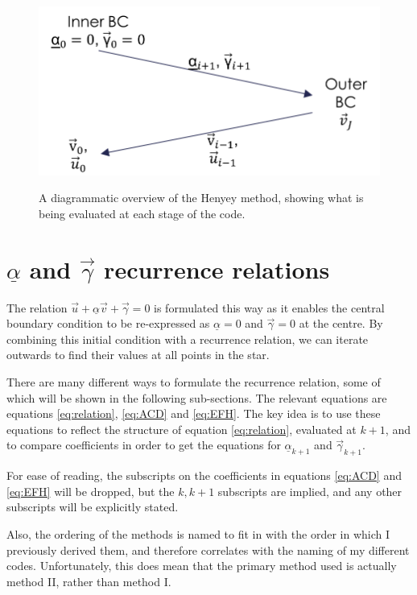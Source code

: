 \documentclass[11pt]{amsart}
\begin{document}
\begin{figure}
\begin{center}
\label{fig:overview}
\includegraphics[width = 0.5 \textwidth]{Overview.png}
\caption{A diagrammatic overview of the Henyey method, showing what is being evaluated at each stage of the code.}
\end{center}
\end{figure}



\section{$\underline{\alpha}$ and $\vec{\gamma}$ recurrence relations}

The relation $\vec{u} + \underline{\alpha} \vec{v} + \vec{\gamma} = 0$ is formulated this way as it enables the central boundary condition to be re-expressed as $\underline{\alpha} = 0$ and $\vec{\gamma} = 0$ at the centre.  By combining this initial condition with a recurrence relation, we can iterate outwards to find their values at all points in the star.

There are many different ways to formulate the recurrence relation, some of which will be shown in the following sub-sections.  The relevant equations are equations \ref{eq:relation}, \ref{eq:ACD} and \ref{eq:EFH}.  The key idea is to use these equations to reflect the structure of equation \ref{eq:relation}, evaluated at $k+1$, and to compare coefficients in order to get the equations for $\underline{\alpha}_{k+1}$ and $\vec{\gamma}_{k+1}$.

For ease of reading, the subscripts on the coefficients in equations \ref{eq:ACD} and \ref{eq:EFH} will be dropped, but the $k,k+1$ subscripts are implied, and any other subscripts will be explicitly stated.

Also, the ordering of the methods is named to fit in with the order in which I  previously derived them, and therefore correlates with the naming of my different codes.  Unfortunately, this does mean that the primary method used is actually method II, rather than method I.
\end{document}
